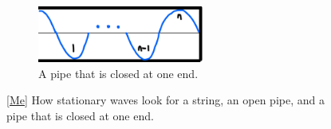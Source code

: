 \documentclass[oneside]{book}
\begin{document}
\begin{itemize}
\begin{figure}[H]
        \vspace{1em}
        \begin{subfigure}[c]{0.5\textwidth}
            \centering
            \includegraphics[width=0.6\textwidth]{../images/Pipe Closed at One End.jpg}
            \caption{A pipe that is closed at one end.}
        \end{subfigure}%
        \caption{\ref{Me} How stationary waves look for a string, an open pipe, and a pipe that is closed at one end.}
        \label{fig:stationary-waves-strings-and-pipes}
    \end{figure}


\end{itemize}
\end{document}
